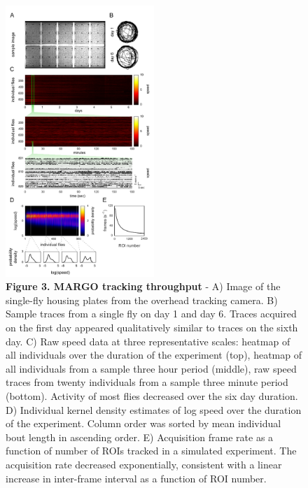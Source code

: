 \documentclass[10pt]{article}
\begin{document}
\newpage
\begin{figure}[h!]
	\begin{center}
		\includegraphics[width=0.5\textwidth]{../figures/960_fly_imaging_panel_sm.pdf}
	\end{center}
	\caption*{\footnotesize \textbf{Figure 3. MARGO tracking throughput} - A) Image of the single-fly housing plates from the overhead tracking camera. B) Sample traces from a single fly on day 1 and day 6. Traces acquired on the first day appeared qualitatively similar to traces on the sixth day. C) Raw speed data at three representative scales: heatmap of all individuals over the duration of the experiment (top), heatmap of all individuals from a sample three hour period (middle), raw speed traces from twenty individuals from a sample three minute period (bottom). Activity of most flies decreased over the six day duration. D) Individual kernel density estimates of log speed over the duration of the experiment. Column order was sorted by mean individual bout length in ascending order. E) Acquisition frame rate as a function of number of ROIs tracked in a simulated experiment. The acquisition rate decreased exponentially, consistent with a linear increase in inter-frame interval as a function of ROI number.}
\end{figure}
\end{document}
